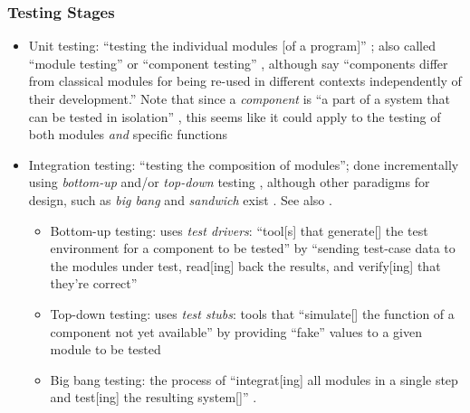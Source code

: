 \subsubsection{Testing Stages}
\begin{itemize}
      \item Unit testing: ``testing the individual modules [of a program]''
            \citep[p.~438]{vanVliet2000}; also called ``module testing''
            \citep[p.~109]{Patton2006} or ``component testing''
            \citep[p.~444]{PetersAndPedrycz2000}, although
            \citet[p.~107]{BaresiAndPezzè2006} say ``components differ from
            classical modules for being re-used in different contexts
            independently of their development.'' Note that since a
            \emph{component} is ``a part of a system that can be tested in
            isolation'' , this seems like it could apply
            to the testing of both modules \emph{and} specific functions
      \item Integration testing: ``testing the composition of modules'';
            done incrementally using \emph{bottom-up} and/or
            \emph{top-down} testing \citep[pp.~438-439]{vanVliet2000},
            although other paradigms for design, such as \emph{big bang} and
            \emph{sandwich} exist \citep[p.~489]{PetersAndPedrycz2000}.
            See also \citep[p.~109]{Patton2006}.
            \begin{itemize}
                  \item Bottom-up testing: uses \emph{test drivers}: ``tool[s]
                        that generate[] the test environment for a component to
                        be tested'' \citep[p.~410]{vanVliet2000} by
                        ``sending test-case data to the modules under test,
                        read[ing] back the results, and verify[ing] that
                        they're correct'' \citep[p.~109]{Patton2006}
                  \item Top-down testing: uses \emph{test stubs}: tools that
                        ``simulate[] the function of a component not yet
                        available'' \citep[p.~410]{vanVliet2000} by
                        providing ``fake'' values to a given module to be
                        tested \citep[p.~110]{Patton2006}
                  \item Big bang testing: the process of ``integrat[ing] all
                        modules in a single step and test[ing] the resulting
                        system[]'' \citep[p.~489]{PetersAndPedrycz2000}.

\end{itemize}
\end{itemize}
